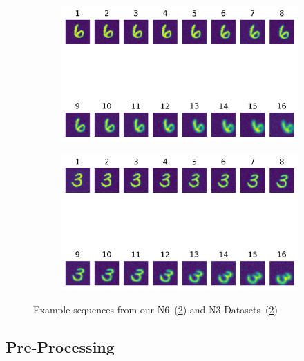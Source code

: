 \documentclass[twocolumn]{article}
\begin{document}
\begin{figure}
    \centering
    \begin{subfigure}{0.4\textwidth}
        \includegraphics[width=\textwidth]{assets/seq-305.png}
        \caption{}
        \label{subfig:n6-seq}
    \end{subfigure}\hfill
    \begin{subfigure}{0.4\textwidth}
        \includegraphics[width=\textwidth]{assets/n3-seq-94.png}
        \caption{}
        \label{subfig:n3-seq}
    \end{subfigure}
    \label{fig:seqs}
    \caption{Example sequences from our N6~(\ref{subfig:n3-seq}) and N3 Datasets~(\ref{subfig:n3-seq})}
\end{figure}

\subsection{Pre-Processing}
\end{document}
